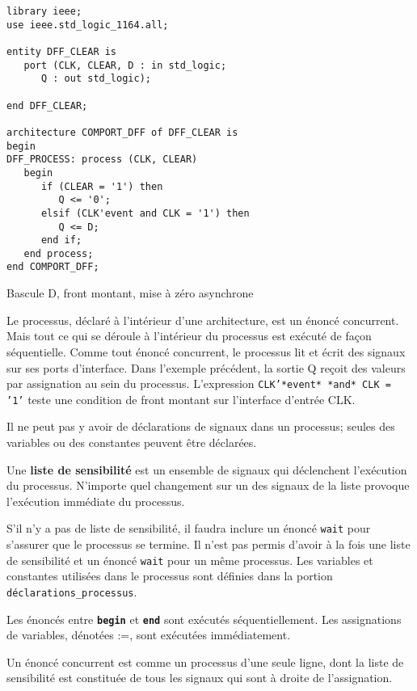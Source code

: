 \documentclass[letter, oneside]{book}
\begin{document}
\begin{listing}[htbp]
\begin{verbatim}
library ieee;
use ieee.std_logic_1164.all;

entity DFF_CLEAR is
   port (CLK, CLEAR, D : in std_logic;
      Q : out std_logic);

end DFF_CLEAR;

architecture COMPORT_DFF of DFF_CLEAR is
begin
DFF_PROCESS: process (CLK, CLEAR)
   begin
      if (CLEAR = '1') then
         Q <= '0';
      elsif (CLK'event and CLK = '1') then
         Q <= D;
      end if;
   end process;
end COMPORT_DFF;
\end{verbatim}
\caption{Bascule D, front montant, mise à zéro asynchrone}
\end{listing}

Le processus, déclaré à l'intérieur d'une architecture, est un énoncé
concurrent.  Mais tout ce qui se déroule à l'intérieur du processus
est exécuté de façon séquentielle. Comme tout énoncé concurrent, le
processus lit et écrit des signaux sur ses ports d'interface. Dans
l'exemple précédent, la sortie Q reçoit des valeurs par assignation au
sein du processus. L'expression \texttt{CLK'*event* *and* CLK = '1'} teste une
condition de front montant sur l'interface d'entrée CLK.

Il ne peut pas y avoir de déclarations de signaux dans un processus;
seules des variables ou des constantes peuvent être déclarées.

Une \textbf{liste de sensibilité} est un ensemble de signaux qui déclenchent
l'exécution du processus. N'importe quel changement sur un des signaux
de la liste provoque l'exécution immédiate du processus.

S'il n'y a pas de liste de sensibilité, il faudra inclure un énoncé
\texttt{wait} pour s'assurer que le processus se termine. Il n'est pas permis
d'avoir à la fois une liste de sensibilité et un énoncé \texttt{wait} pour un
même processus. Les variables et constantes utilisées dans le
processus sont définies dans la portion \texttt{déclarations\_processus}. 

Les énoncés entre \textbf{\texttt{begin}} et \textbf{\texttt{end}} sont exécutés séquentiellement. Les
assignations de variables, dénotées :=, sont exécutées immédiatement. 

Un énoncé concurrent est comme un processus d'une seule ligne, dont la
liste de sensibilité est constituée de tous les signaux qui sont à
droite de l'assignation.
\end{document}
